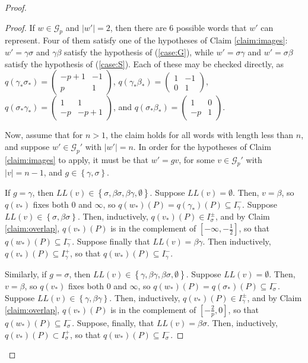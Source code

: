 \documentclass{amsart}     %
\newcommand{\set}[1]{ \left\{ #1 \right\} }
\theoremstyle{definition}
\begin{document}
\begin{proof}
\begin{proof}
If $w \in \mathcal{G}_p$ and $|w'| = 2$, then there are 6 possible words that $w'$ can represent. Four of them satisfy one of the hypotheses of Claim \ref{claim:images}: $w' = \gamma \sigma$ and $\gamma \beta$ satisfy the hypothesis of (\ref{case:G}), while  $w' = \sigma \gamma$ and $w' =  \sigma \beta $ satisfy the hypothesis of (\ref{case:S}). Each of these may be checked directly, as $q(\gamma_* \sigma_*) = \begin{pmatrix} -p+1 & -1 \\ p & 1 \end{pmatrix}$, $q(\gamma_* \beta_*)= \begin{pmatrix} 1 & -1 \\ 0 & 1 \end{pmatrix}$, $q(\sigma_* \gamma_*) = \begin{pmatrix} 1 & 1 \\ -p & -p+1 \end{pmatrix}$, and $q(\sigma_* \beta_*)= \begin{pmatrix} 1 & 0 \\ -p & 1 \end{pmatrix}$.

Now, assume that for $n > 1$, the claim holds for all words with length less than $n$, and suppose $w' \in \mathcal{G}_p'$ with $|w'| = n$. 
In order for the hypotheses of Claim \ref{claim:images} to apply, it must be that $w' = gv$, for some $v \in \mathcal{G}_p'$ with $|v| = n-1$, and $g \in \set{\gamma, \sigma}$. 

If $g = \gamma$, then $LL(v) \in \set{\sigma,  \beta \sigma,  \beta \gamma, \emptyset}$. Suppose $LL(v) = \emptyset$. Then, $v = \beta$, so $q(v_*)$ fixes both $0$ and $\infty$, so $q(w_*)(P) = q(\gamma_*)(P) \subseteq I_\gamma^-$. Suppose $LL(v) \in \set{\sigma, \beta \sigma}$. Then, inductively, $q(v_*)(P) \in I_\sigma^{\pm}$, and by Claim \ref{claim:overlap}, $q(v_*)(P)$ is in the complement of $[-\infty, -\frac{1}{2}]$, so that $q(w_*)(P) \subseteq I_\gamma^-$. Suppose finally that $LL(v) = \beta \gamma$. Then inductively, $q(v_*)(P) \subseteq I_\gamma^+$, so that $q(w_*)(P) \subseteq I_\gamma^-$. 

Similarly, if $g = \sigma$, then
$LL(v) \in \set{\gamma, \beta \gamma, \beta \sigma, \emptyset}$. Suppose $LL(v) = \emptyset$. Then, $v = \beta$, so $q(v_*)$ fixes both $0$ and $\infty$, so $q(w_*)(P) = q(\sigma_*)(P) \subseteq I_\sigma^-$. Suppose $LL(v) \in \set{\gamma, \beta \gamma}$. Then, inductively, $q(v_*)(P) \in I_\gamma^{\pm}$, and by Claim \ref{claim:overlap}, $q(v_*)(P)$ is in the complement of $[-\frac{2}{p}, 0]$, so that $q(w_*)(P) \subseteq I_\sigma^-$. Suppose, finally, that $LL(v) = \beta \sigma$. Then, inductively, $q(v_*)(P) \subset I_\sigma^+$, so that $q(w_*)(P) \subseteq I_\sigma^-$.
\end{proof}


\end{proof}
\end{document}

